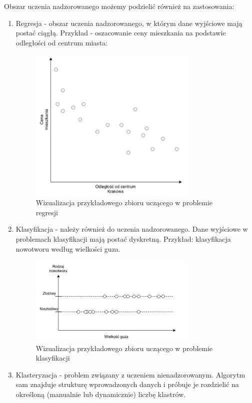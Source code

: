 Obszar uczenia nadzorowanego możemy podzielić również na zastosowania:
\begin{enumerate}
    \item Regresja - obszar uczenia nadzorowanego, w którym dane wyjściowe mają postać ciągłą. Przykład - oszacowanie ceny mieszkania na podstawie odległości od centrum miasta:
    
    \begin{figure}[H]
    \includegraphics[width=8cm]{regression_dataset_example.png}
    \centering
    \caption{Wizualizacja przykładowego zbioru uczącego w problemie regresji}
    \end{figure}
    
    \item Klasyfikacja - należy również do uczenia nadzorowanego. Dane wyjściowe w problemach klasyfikacji mają postać dyskretną. Przykład: klasyfikacja nowotworu według wielkości guza.
    
    \begin{figure}[H]
    \includegraphics[width=8cm]{classification_dataset_example.png}
    \centering
    \caption{Wizualizacja przykładowego zbioru uczącego w problemie klasyfikacji}
    \end{figure}    
    
    \item Klasteryzacja - problem związany z uczeniem nienadzorowanym. Algorytm sam znajduje strukturę wprowadzonych danych i próbuje je rozdzielić na określoną (manualnie lub dynamicznie) liczbę klastrów.
    

\end{enumerate}
